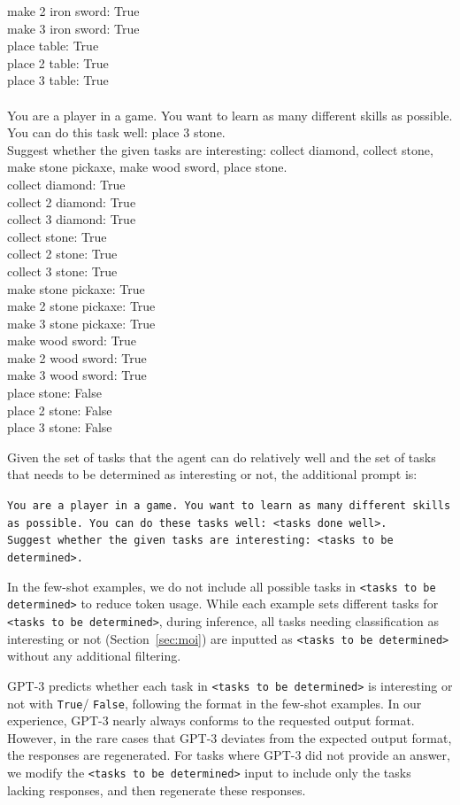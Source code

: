 \documentclass{article} %
\begin{document}
{make 2 iron sword: True\\
make 3 iron sword: True\\
place table: True\\
place 2 table: True\\
place 3 table: True\\\\
You are a player in a game. You want to learn as many different skills as possible. You can do this task well: place 3 stone.\\
Suggest whether the given tasks are interesting: collect diamond, collect stone, make stone pickaxe, make wood sword, place stone.\\
collect diamond: True\\
collect 2 diamond: True\\
collect 3 diamond: True\\
collect stone: True\\
collect 2 stone: True\\
collect 3 stone: True\\
make stone pickaxe: True\\
make 2 stone pickaxe: True\\
make 3 stone pickaxe: True\\
make wood sword: True\\
make 2 wood sword: True\\
make 3 wood sword: True\\
place stone: False\\
place 2 stone: False\\
place 3 stone: False
}

Given the set of tasks that the agent can do relatively well and the set of tasks that needs to be determined as interesting or not, the additional prompt is:

\texttt{You are a player in a game. You want to learn as many different skills as possible. You can do these tasks well: <tasks done well>.\\
Suggest whether the given tasks are interesting: <tasks to be determined>.}

In the few-shot examples, we do not include all possible tasks in \texttt{<tasks to be determined>} to reduce token usage. While each example sets different tasks for \texttt{<tasks to be determined>}, during inference, all tasks needing classification as interesting or not (Section~\ref{sec:moi}) are inputted as \texttt{<tasks to be determined>} without any additional filtering.

GPT-3 predicts whether each task in \texttt{<tasks to be determined>} is interesting or not with \texttt{True}/ \texttt{False}, following the format in the few-shot examples. In our experience, GPT-3 nearly always conforms to the requested output format. However, in the rare cases that GPT-3 deviates from the expected output format, the responses are regenerated. For tasks where GPT-3 did not provide an answer, we modify the \texttt{<tasks to be determined>} input to include only the tasks lacking responses, and then regenerate these responses.
\end{document}
